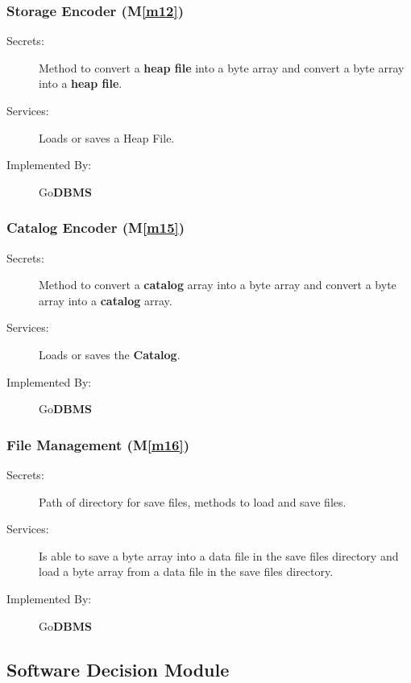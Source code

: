 \documentclass[12pt, titlepage]{article}
\newcommand{\mref}[1]{M\ref{#1}}
\begin{document}
\subsubsection{Storage Encoder (\mref{m12})}
\begin{description}
\item[Secrets:]Method to convert a \textbf{heap file} into a byte array and convert a byte array into a \textbf{heap file}.
\item[Services:]Loads or saves a Heap File.
\item[Implemented By:] Go\textbf{DBMS}
\end{description}

\subsubsection{\textbf{Catalog} Encoder (\mref{m15})}
\begin{description}
\item[Secrets:]Method to convert a \textbf{catalog} array into a byte array and convert a byte array into a \textbf{catalog} array.
\item[Services:]Loads or saves the \textbf{Catalog}.
\item[Implemented By:] Go\textbf{DBMS}
\end{description}

\subsubsection{File Management (\mref{m16})}
\begin{description}
\item[Secrets:]Path of directory for save files, methods to load and save files.
\item[Services:]Is able to save a byte array into a data file in the save files directory and load a byte array from a data file in the save files directory.
\item[Implemented By:] Go\textbf{DBMS}
\end{description}

\subsection{Software Decision Module}
\end{document}
